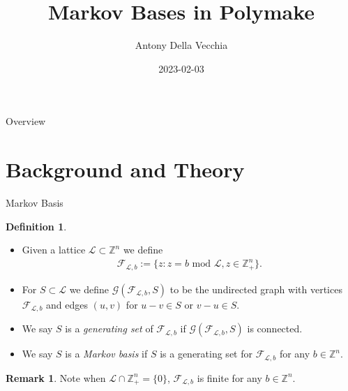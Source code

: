 \documentclass[9pt]{beamer}
\author{Antony Della Vecchia}
\title{Markov Bases in Polymake}
\institute[]{
Technische Universit\"at Berlin
}
\date{
2023-02-03
}
\newcommand\set[1]{\{#1\}}
\newcommand\Z{\mathbb{Z}}
\theoremstyle{definition}
\newtheorem{remark}{Remark}
\newtheorem{defn}{Definition}
\begin{document}
\maketitle
\begin{frame}[fragile]{Overview}
  \begin{tcolorbox}
    \tableofcontents
  \end{tcolorbox}
\end{frame}

\section{Background and Theory}

\begin{frame}[fragile]{Markov Basis}
  \begin{defn}
    \begin{itemize}
      \item Given a lattice $\mathcal{L}  \subset \Z^n$ we define
        \begin{align*}
          \mathcal{F}_{\mathcal{L}, b} := \set{z : z = b \text{ mod } \mathcal{L} , z \in \Z^n_+}.
        \end{align*}
      \item For $S \subset \mathcal{L}$ we define
        $\mathcal{G}(\mathcal{F}_{\mathcal{L}, b}, S)$ to be the undirected graph with vertices
        $\mathcal{F}_{\mathcal{L}, b}$ and edges $(u,v)$ for $u - v \in S$ or $v - u \in S$.
      \item We say $S$ is a \emph{generating set} of $\mathcal{F}_{\mathcal{L}, b}$ if
        $\mathcal{G}(\mathcal{F}_{\mathcal{L}, b}, S)$ is connected.
      \item We say $S$ is a \emph{Markov basis} if $S$ is a generating set for $\mathcal{F}_{\mathcal{L}, b}$ for any $b \in \Z^n$.
    \end{itemize}
  \end{defn}
  \begin{remark}
    Note when $\mathcal{L} \cap \Z^n_+ = \set{0}$, $\mathcal{F}_{\mathcal{L}, b}$ is finite for any $b \in \Z^n$.
  \end{remark}
\end{frame}
\end{document}
